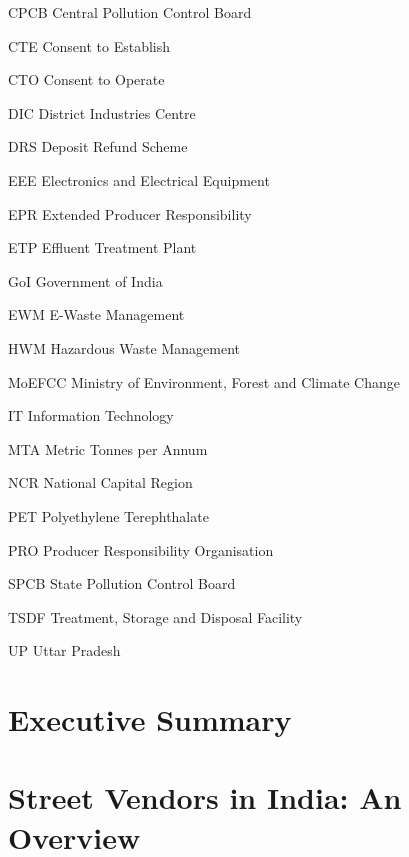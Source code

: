 \documentclass[a4paper, 12pt, twoside]{article}
\begin{document}
\begin{abbrv}
         
        \item[CPCB]			Central Pollution Control Board
        \item[CTE]				Consent to Establish
        \item[CTO]			Consent to Operate
        \item[DIC]				District Industries Centre
        \item[DRS]			Deposit Refund Scheme
        \item[EEE]				Electronics and Electrical Equipment 
        \item[EPR]				Extended Producer Responsibility
        \item[ETP]				Effluent Treatment Plant 
        \item[GoI]				Government of India
        \item[EWM]			E-Waste Management
        \item[HWM]			Hazardous Waste Management
        \item[MoEFCC]			Ministry of Environment, Forest and Climate Change
        \item[IT]				Information Technology 
        \item[MTA]				Metric Tonnes per Annum
        \item[NCR]			National Capital Region
        \item[PET]				Polyethylene Terephthalate
        \item[PRO]			Producer Responsibility Organisation
        \item[SPCB]			State Pollution Control Board
        \item[TSDF]			Treatment, Storage and Disposal Facility
        \item[UP]				Uttar Pradesh
        
\end{abbrv}

\newpage
\section*{Executive Summary}

\newpage
\section{Street Vendors in India: An Overview}
\end{document}
